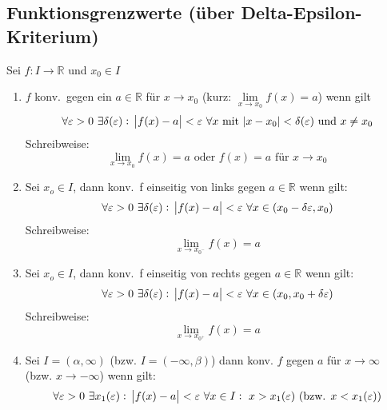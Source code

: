 \documentclass[10pt]{article}
\newcommand{\R}{\mathbb{R}}
\begin{document}
    \subsection{Funktionsgrenzwerte (über Delta-Epsilon-Kriterium)}
    Sei $f: I \rightarrow \R$ und $x_0 \in I$
    \begin{enumerate}[label= (\alph*)]
        \item $f$ konv.\ gegen ein $a\in \R$ für $x \rightarrow x_0$
            (kurz: $\lim\limits_{x \rightarrow x_0} f(x)=a$) wenn gilt
            \begin{equation*}
                \forall \varepsilon > 0\ \exists \delta(\varepsilon):\
                \abs{f(x) - a} < \varepsilon\ \forall x \text{ mit }
                \abs{x- x_0} < \delta(\varepsilon) \text{ und } x \neq x_0
            \end{equation*}
            Schreibweise:
            \begin{equation*}
                \lim_{x \rightarrow x_0} f(x) = a
                \text{ oder } f(x)=a \text{ für } x \rightarrow x_0
            \end{equation*}
        \item Sei $x_o \in I$, dann konv.\ f einseitig von links
            gegen $a\in\R$ wenn gilt:
            \begin{equation*}
                \forall \varepsilon > 0\  \exists \delta(\varepsilon):\
                \abs{f(x) -a} < \varepsilon\ \forall x \in
                (x_0 - \delta{\varepsilon}, x_0)
             \end{equation*}
            Schreibweise:
            \begin{equation*}
                \lim_{x \rightarrow x_{0^-}} f(x) = a
            \end{equation*}
        \item Sei $x_o \in I$, dann konv.\ f einseitig von rechts
            gegen $a\in\R$ wenn gilt:
            \begin{equation*}
                \forall \varepsilon > 0\  \exists \delta(\varepsilon):\
                \abs{f(x) -a} < \varepsilon\ \forall x \in
                (x_0 , x_0 + \delta{\varepsilon})
             \end{equation*}
            Schreibweise:
            \begin{equation*}
                \lim_{x \rightarrow x_{0^+}} f(x) = a
            \end{equation*}
        \item Sei $I = (\alpha, \infty)$ (bzw. $I = (-\infty, \beta)$) dann
            konv. $f$ gegen $a$ für $x \rightarrow \infty$
            (bzw. $x \rightarrow -\infty$) wenn gilt:
            \begin{equation*}
                \forall \varepsilon > 0\ \exists x_1(\varepsilon):\
                \abs{f(x) - a}<\varepsilon\ \forall x \in I:\ x > x_1(\varepsilon)
                \text{ (bzw. } x < x_1(\varepsilon) \text{)}
            \end{equation*}
    \end{enumerate}
\end{document}
